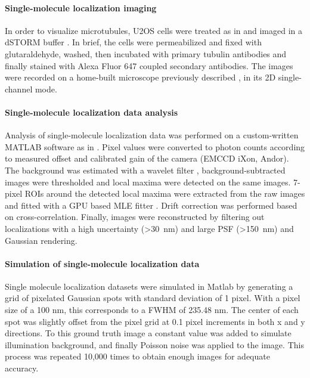 \paragraph{Single-molecule localization imaging}
In order to visualize microtubules, U2OS cells were treated as in \cite{deschamps_3d_2014} and imaged in a dSTORM buffer \cite{heilemann_subdiffraction-resolution_2008}. In brief, the cells were permeabilized and fixed with glutaraldehyde, washed, then incubated with primary tubulin antibodies and finally stained with Alexa Fluor 647 coupled secondary antibodies. The images were recorded on a home-built microscope previously described \cite{deschamps_3d_2014}, in its 2D single-channel mode.

\paragraph{Single-molecule localization data analysis}
Analysis of single-molecule localization data was performed on a custom-written MATLAB software as in \cite{deschamps_efficient_2016}. Pixel values were converted to photon counts according to measured offset and calibrated gain of the camera (EMCCD iXon, Andor). The background was estimated with a wavelet filter \cite{izeddin_wavelet_2012}, background-subtracted images were thresholded and local maxima were detected on the same images. 7-pixel ROIs around the detected local maxima were extracted from the raw images and fitted with a GPU based MLE fitter \cite{smith_fast_2010}. Drift correction was performed based on cross-correlation. Finally, images were
reconstructed by filtering out localizations with a high uncertainty (>\SI{30}{nm}) and large PSF (>\SI{150}{nm}) and Gaussian rendering.

\paragraph{Simulation of single-molecule localization data}
Single molecule localization datasets were simulated in Matlab by generating a grid of pixelated Gaussian spots with standard deviation of 1 pixel. With a pixel size of a 100 nm, this corresponds to a FWHM of 235.48 nm. The center of each spot was slightly offset from the pixel grid at 0.1 pixel increments in both x and y directions. To this ground truth image a constant value was added to simulate illumination background, and finally Poisson noise was applied to the image. This process was repeated 10,000 times to obtain enough images for adequate accuracy.

